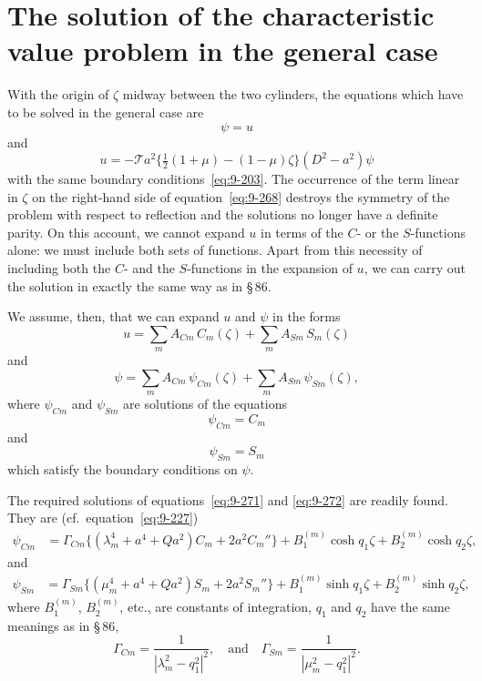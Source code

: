 \section{The solution of the characteristic value problem in the general case}
\label{sec:87}

With the origin of $\zeta$ midway between the two cylinders, the equations which have to be solved in the general case are
\begin{equation}
[(D^2 - a^2)^2 + Qa^2]\psi = u \label{eq:9-267}
\end{equation}
and
\begin{equation}
[(D^2 - a^2)^2 + Qa^2]u = -\mathscr{T} a^2\{\tfrac{1}{2}(1+\mu) - (1-\mu)\zeta\}(D^2 - a^2)\psi \label{eq:9-268}
\end{equation}
with the same boundary conditions~\eqref{eq:9-203}. The occurrence of the term linear in $\zeta$ on the right-hand side of equation~\eqref{eq:9-268} destroys the symmetry of the problem with respect to reflection and the solutions no longer have a definite parity. On this account, we cannot expand $u$ in terms of the $C$- or the $S$-functions alone: we must include both sets of functions. Apart from this necessity of including both the $C$- and the $S$-functions in the expansion of $u$, we can carry out the solution in exactly the same way as in \S\,86.

We assume, then, that we can expand $u$ and $\psi$ in the forms
\begin{equation}
u = \sum_m A_{Cm}\, C_m(\zeta) + \sum_m A_{Sm}\, S_m(\zeta) \label{eq:9-269}
\end{equation}
and
\begin{equation}
\psi = \sum_m A_{Cm}\, \psi_{Cm}(\zeta) + \sum_m A_{Sm}\, \psi_{Sm}(\zeta), \label{eq:9-270}
\end{equation}
where $\psi_{Cm}$ and $\psi_{Sm}$ are solutions of the equations
\begin{equation}
[(D^2 - a^2)^2 + Qa^2]\psi_{Cm} = C_m \label{eq:9-271}
\end{equation}
and
\begin{equation}
[(D^2 - a^2)^2 + Qa^2]\psi_{Sm} = S_m \label{eq:9-272}
\end{equation}
which satisfy the boundary conditions on $\psi$.

The required solutions of equations~\eqref{eq:9-271} and \eqref{eq:9-272} are readily found. They are (cf.\ equation~\eqref{eq:9-227})
\begin{align}
\psi_{Cm} &= \Gamma_{Cm}\{(\lambda_m^4 + a^4 + Qa^2)C_m + 2a^2 C_m''\} + B_1^{(m)}\cosh q_1\zeta + B_2^{(m)}\cosh q_2\zeta, \label{eq:9-273}
\end{align}
and
\begin{align}
\psi_{Sm} &= \Gamma_{Sm}\{(\mu_m^4 + a^4 + Qa^2)S_m + 2a^2 S_m''\} + B_1^{(m)}\sinh q_1\zeta + B_2^{(m)}\sinh q_2\zeta, \label{eq:9-274}
\end{align}
where $B_1^{(m)}$, $B_2^{(m)}$, etc., are constants of integration, $q_1$ and $q_2$ have the same meanings as in \S\,86,
\begin{equation}
\Gamma_{Cm} = \frac{1}{|\lambda_m^2 - q_1^2|^2}, \quad \text{and} \quad \Gamma_{Sm} = \frac{1}{|\mu_m^2 - q_1^2|^2}. \label{eq:9-275}
\end{equation}

